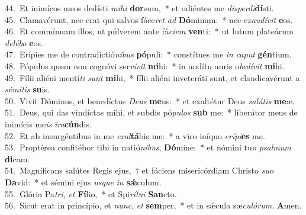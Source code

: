 {44.~}Et inimícos meos dedísti \textit{mi}\textit{hi} \textbf{dor}sum,~* et odiéntes me \textit{di}\textit{sper}\textit{di}\textbf{dí}sti.\\
{45.~}Clamavérunt, nec erat qui salvos fáce\textit{ret} \textit{ad} \textbf{Dó}minum:~* nec e\textit{xau}\textit{dí}\textit{vit} \textbf{e}os.\\
{46.~}Et commínuam illos, ut púlverem ante fá\textit{ci}\textit{em} \textbf{ven}ti:~* ut lutum plateárum \textit{de}\textit{lé}\textit{bo} \textbf{e}os.\\
{47.~}Erípies me de contradictió\textit{ni}\textit{bus} \textbf{pó}puli:~* constítues me \textit{in} \textit{ca}\textit{put} \textbf{gén}tium.\\
{48.~}Pópulus quem non cognóvi ser\textit{ví}\textit{vit} \textbf{mi}hi:~* in audítu auris o\textit{be}\textit{dí}\textit{vit} \textbf{mi}hi.\\
{49.~}Fílii aliéni mentí\textit{ti} \textit{sunt} \textbf{mi}hi,~* fílii aliéni inveteráti sunt, et claudicavérunt a \textit{sé}\textit{mi}\textit{tis} \textbf{su}is.\\
{50.~}Vivit Dóminus, et benedíctus \textit{De}\textit{us} \textbf{me}us:~* et exaltétur Deus \textit{sa}\textit{lú}\textit{tis} \textbf{me}æ.\\
{51.~}Deus, qui das vindíctas mihi, et subdis pó\textit{pu}\textit{los} \textbf{sub} me:~* liberátor meus de inimícis me\textit{is} \textit{i}\textit{ra}\textbf{cún}dis.\\
{52.~}Et ab insurgéntibus in me \textit{e}\textit{xal}\textbf{tá}bis me:~* a viro iníquo \textit{e}\textit{rí}\textit{pi}\textbf{es} me.\\
{53.~}Proptérea confitébor tibi in natió\textit{ni}\textit{bus}, \textbf{Dó}mine:~* et nómini tu\textit{o} \textit{psal}\textit{mum} \textbf{di}cam.\\
{54.~}Magníficans salútes Regis ejus,~† et fáciens misericórdiam Christo \textit{su}\textit{o} \textbf{Da}vid:~* et sémini ejus \textit{us}\textit{que} \textit{in} \textbf{sǽ}culum.\\
{55.~}Glória Pa\textit{tri}, \textit{et} \textbf{Fí}lio,~* et Spi\textit{rí}\textit{tu}\textit{i} \textbf{San}cto.\\
{56.~}Sicut erat in princípio, et \textit{nunc}, \textit{et} \textbf{sem}per,~* et in sǽcula sæ\textit{cu}\textit{ló}\textit{rum}. \textbf{A}men.\\
